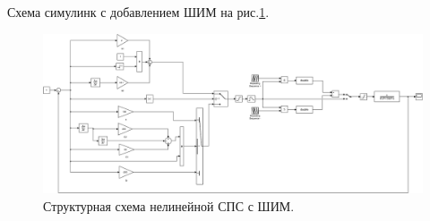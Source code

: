 Схема симулинк с добавлением ШИМ на  рис.\ref{fig:sim_final_VSS_PWM}. 
\begin{figure}\centering
	\includegraphics[width=1.0\linewidth]{images/sim_final_VSS_PWM}
	\caption{Структурная схема нелинейной СПС с ШИМ. }\label{fig:sim_final_VSS_PWM}
\end{figure}

